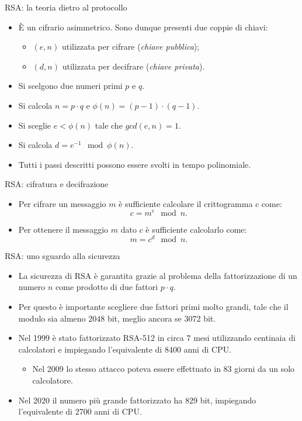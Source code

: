 \documentclass[11pt,svgnames,smaller,aspectratio=169,italian]{beamer}
\begin{document}
\begin{frame}{RSA: la teoria dietro al protocollo}
	\begin{itemize}
		\item È un cifrario asimmetrico. Sono dunque presenti due coppie di chiavi:
		\begin{itemize}
			\item $(e, n)$ utilizzata per cifrare (\emph{chiave pubblica});
			\item $(d, n)$ utilizzata per decifrare (\emph{chiave privata}).
		\end{itemize}
		\item Si scelgono due numeri primi $p$ e $q$.
		\item Si calcola $n = p \cdot q$ e $\phi(n) = (p - 1) \cdot (q - 1)$.
		\item Si sceglie $e < \phi(n)$ tale che $gcd(e, n) = 1$.
		\item Si calcola $d = e^{-1} \mod \phi(n)$.
		\item Tutti i passi descritti possono essere svolti in tempo polinomiale.
	\end{itemize}
\end{frame}

\begin{frame}{RSA: cifratura e decifrazione}
	\begin{itemize}
		\item Per cifrare un messaggio $m$ è sufficiente calcolare il crittogramma $c$ come:
		\begin{equation*}
			c = m^{e} \mod n.
		\end{equation*}
		\item Per ottenere il messaggio $m$ dato $c$ è sufficiente calcolarlo come:
		\begin{equation*}
			m = c^{d} \mod n.
		\end{equation*}
		
	\end{itemize}
	
\end{frame}

\begin{frame}{RSA: uno sguardo alla sicurezza}
	\begin{itemize}
		\item La sicurezza di RSA è garantita grazie al problema della fattorizzazione di un numero $n$ come prodotto di due fattori $p \cdot q$.
		\item Per questo è importante scegliere due fattori primi molto grandi, tale che il modulo sia almeno $2048$ bit, meglio ancora se $3072$ bit.
		\item Nel 1999 è stato fattorizzato RSA-512 in circa $7$ mesi utilizzando centinaia di calcolatori e impiegando l'equivalente di 8400 anni di CPU.
			\begin{itemize}
				\item Nel 2009 lo stesso attacco poteva essere effettuato in 83 giorni da un solo calcolatore.
			\end{itemize}
		\item Nel 2020 il numero più grande fattorizzato ha 829 bit, impiegando l'equivalente di 2700 anni di CPU.
	\end{itemize}
\end{frame}
\end{document}
